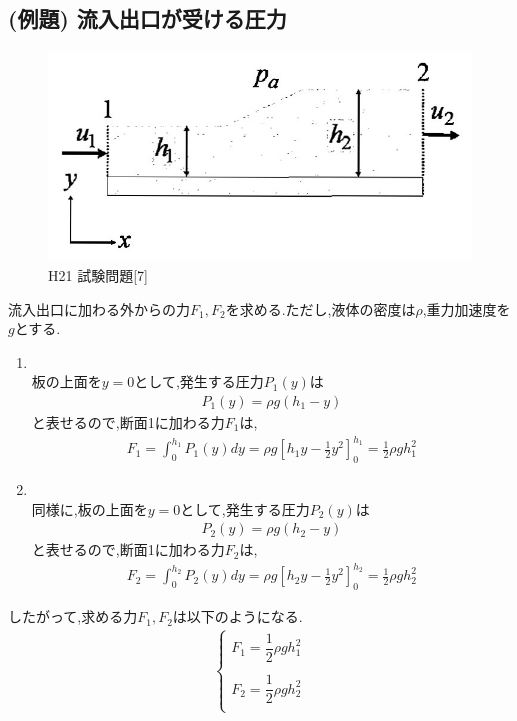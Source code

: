 \documentclass[a4paper]{jsarticle}
\begin{document}
\subsection{(例題) 流入出口が受ける圧力}
\begin{figure}[htbp]
    \begin{center}
        \includegraphics[width=120mm]{images/ryuriki_image4.jpg}
        \caption{H21 試験問題[7]}
    \end{center}
\end{figure}
流入出口に加わる外からの力$F_1,F_2$を求める.ただし,液体の密度は$\rho$,重力加速度を$g$とする.
\begin{enumerate}[(1)]
    \item {}\\
          板の上面を$y=0$として,発生する圧力$P_1\left(y\right)$は
          \begin{eqnarray*}
              P_1\left(y\right)=\rho g \left(h_1-y\right)
          \end{eqnarray*}
          と表せるので,断面1に加わる力$F_1$は,
          \begin{eqnarray*}
              F_1=\int_0^{h_1} P_1\left(y\right)dy =\rho g \left[h_1y - \frac{1}{2}y^2\right]_0^{h_1} = \frac{1}{2}\rho g h_1^2
          \end{eqnarray*}
    \item {}\\
          同様に,板の上面を$y=0$として,発生する圧力$P_2\left(y\right)$は
          \begin{eqnarray*}
              P_2\left(y\right)=\rho g \left(h_2-y\right)
          \end{eqnarray*}
          と表せるので,断面1に加わる力$F_2$は,
          \begin{eqnarray*}
              F_2=\int_0^{h_2} P_2\left(y\right)dy =\rho g \left[h_2y - \frac{1}{2}y^2\right]_0^{h_2} = \frac{1}{2}\rho g h_2^2
          \end{eqnarray*}
\end{enumerate}
したがって,求める力$F_1,F_2$は以下のようになる.
\begin{eqnarray*}
    \begin{cases}
        F_1= \dfrac{1}{2}\rho g h_1^2 \\
        \\
        F_2= \dfrac{1}{2}\rho g h_2^2 \\
    \end{cases}
\end{eqnarray*}
\end{document}

